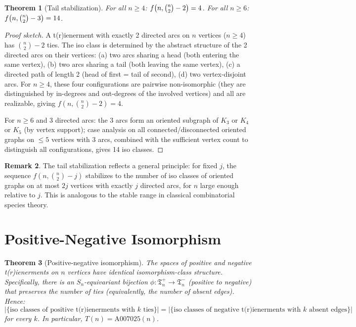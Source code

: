 \documentclass[12pt,reqno]{amsart}
\newtheorem{theorem}{Theorem}[section]
\theoremstyle{definition}
\newtheorem{remark}[theorem]{Remark}
\theoremstyle{plain}
\begin{document}
\begin{theorem}[Tail stabilization]\label{thm:tail-stab}
For all $n\ge 4$: $f\!\left(n,\tbinom{n}{2}-2\right)=4$.
For all $n\ge 6$: $f\!\left(n,\tbinom{n}{2}-3\right)=14$.
\end{theorem}

\begin{proof}[Proof sketch]
A t(r)ienerment with exactly 2 directed arcs on $n$ vertices ($n\ge 4$)
has $\binom{n}{2}-2$ ties.  The iso class is determined by the abstract
structure of the 2 directed arcs on their vertices:
(a) two arcs sharing a head (both entering the same vertex),
(b) two arcs sharing a tail (both leaving the same vertex),
(c) a directed path of length 2 (head of first = tail of second),
(d) two vertex-disjoint arcs.
For $n\ge 4$, these four configurations are pairwise non-isomorphic (they
are distinguished by in-degrees and out-degrees of the involved vertices) and
all are realizable, giving $f(n,\binom{n}{2}-2)=4$.

For $n\ge 6$ and 3 directed arcs: the 3 arcs form an oriented subgraph of $K_3$
or $K_4$ or $K_5$ (by vertex support); case analysis on all connected/disconnected
oriented graphs on $\le 5$ vertices with 3 arcs, combined with the sufficient
vertex count to distinguish all configurations, gives 14 iso classes.
\end{proof}

\begin{remark}
The tail stabilization reflects a general principle: for fixed $j$, the sequence
$f(n,\binom{n}{2}-j)$ stabilizes to the number of iso classes of oriented
graphs on at most $2j$ vertices with exactly $j$ directed arcs, for $n$ large
enough relative to $j$.  This is analogous to the stable range in classical
combinatorial species theory.
\end{remark}

\section{Positive-Negative Isomorphism}
\label{sec:positive-negative}

\begin{theorem}[Positive-negative isomorphism]\label{thm:positive-negative-iso}
The spaces of positive and negative t(r)ienerments on $n$ vertices have
identical isomorphism-class structure.  Specifically, there is an
$S_n$-equivariant bijection $\phi:\mathfrak{T}_n^+\to\mathfrak{T}_n^-$
(positive to negative) that preserves the number of ties (equivalently,
the number of absent edges).  Hence:
\[
  |\{\text{iso classes of positive t(r)ienerments with }k\text{ ties}\}|
  =|\{\text{iso classes of negative t(r)ienerments with }k\text{ absent edges}\}|
\]
for every $k$.  In particular, $T(n)=\mathrm{A007025}(n)$.
\end{theorem}
\end{document}
